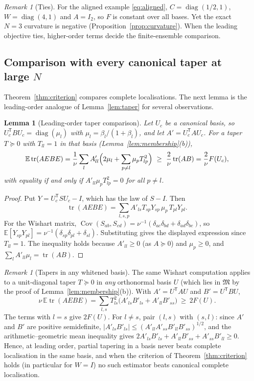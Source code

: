 \documentclass[11pt,a4paper]{article}
\numberwithin{equation}{section}
\newtheorem{lemma}[theorem]{Lemma}
\theoremstyle{remark}\newtheorem{remark}[theorem]{Remark}
\newcommand{\E}{\mathbb E}
\newcommand{\tr}{\operatorname{tr}}
\newcommand{\diag}{\operatorname{diag}}
\newcommand{\Cov}{\operatorname{Cov}}
\newcommand{\T}{^{\mathsf T}}
\begin{document}
\begin{remark}[Ties]\label{rem:tie}
For the aligned example \eqref{eq:aligned}, \(C=\diag(1/2,1)\), \(W=\diag(4,1)\) and \(A=I_2\), so
\(F\) is constant over all bases. Yet the exact \(N=3\) curvature is negative
(Proposition~\ref{prop:curvature}). When the leading objective ties, higher-order terms decide
the finite-ensemble comparison.
\end{remark}

\subsection{Comparison with every canonical taper at large \texorpdfstring{\(N\)}{N}}

Theorem~\ref{thm:criterion} compares complete localisations. The next lemma is the
leading-order analogue of Lemma~\ref{lem:taper} for several observations.

\begin{lemma}[Leading-order taper comparison]\label{lem:taperk}
Let \(U_c\) be a canonical basis, so \(U_c\T BU_c=\diag(\mu_l)\) with \(\mu_l=\beta_l/(1+\beta_l)\), and
let \(A'=U_c\T AU_c\). For a taper \(T\succeq0\) with \(T_{ll}=1\) in that basis
(Lemma~\ref{lem:membership}(b)),
\[
 \E\tr(AEBE)=\frac1\nu\sum_lA'_{ll}\Bigl(2\mu_l+\sum_{p\ne l}\mu_pT_{lp}^2\Bigr)
 \ \ge\ \frac2\nu\tr(AB)=\frac2\nu F(U_c),
\]
with equality if and only if \(A'_{ll}\mu_pT_{lp}^2=0\) for all \(p\ne l\).
\end{lemma}
\begin{proof}
Put \(Y=U_c\T SU_c-I\), which has the law of \(S-I\). Then
\[
 \tr(AEBE)=\sum_{l,s,p}A'_{ls}T_{sp}Y_{sp}\,\mu_p\,T_{pl}Y_{pl}.
\] For the Wishart matrix,
\(\Cov(S_{ab},S_{cd})=\nu^{-1}(\delta_{ac}\delta_{bd}+\delta_{ad}\delta_{bc})\), so
\(\E[Y_{sp}Y_{pl}]=\nu^{-1}(\delta_{sp}\delta_{pl}+\delta_{sl})\). Substituting gives the displayed
expression since \(T_{ll}=1\). The inequality holds because \(A'_{ll}\ge0\) (as \(A\succeq0\)) and
\(\mu_p\ge0\), and \(\sum_lA'_{ll}\mu_l=\tr(AB)\).
\end{proof}

\begin{remark}[Tapers in any whitened basis]\label{rem:anybasis}
The same Wishart computation applies to a unit-diagonal taper \(T\succeq0\) in \emph{any}
orthonormal basis \(U\) (which lies in \(\mathfrak M\) by the proof of
Lemma~\ref{lem:membership}(b)). With \(A'=U\T AU\) and \(B'=U\T BU\),
\[
 \nu\,\E\tr(AEBE)=\sum_{l,s}T_{ls}^2\bigl(A'_{ls}B'_{ls}+A'_{ll}B'_{ss}\bigr)\ \ge\ 2F(U).
\]
The terms with \(l=s\) give \(2F(U)\). For \(l\ne s\), pair \((l,s)\) with \((s,l)\): since \(A'\) and \(B'\)
are positive semidefinite, \(|A'_{ls}B'_{ls}|\le(A'_{ll}A'_{ss}B'_{ll}B'_{ss})^{1/2}\), and the
arithmetic--geometric mean inequality gives
\(2A'_{ls}B'_{ls}+A'_{ll}B'_{ss}+A'_{ss}B'_{ll}\ge0\). Hence, at leading order, partial tapering in
a basis never beats complete localisation in the same basis, and when the criterion of
Theorem~\ref{thm:criterion} holds (in particular for \(W=I\)) no such estimator beats canonical
complete localisation.
\end{remark}
\end{document}
